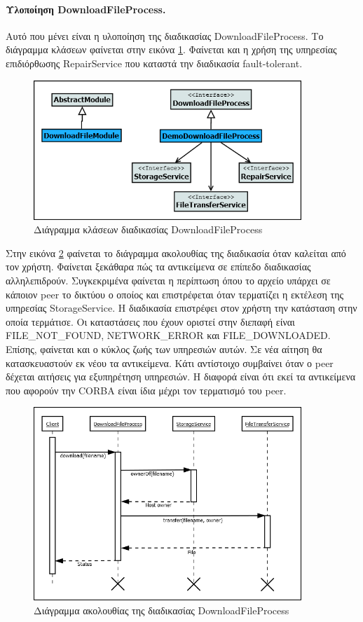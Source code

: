 \paragraph{Υλοποίηση DownloadFileProcess.}
Αυτό που μένει είναι η υλοποίηση της διαδικασίας 
DownloadFileProcess. Το διάγραμμα κλάσεων φαίνεται στην εικόνα 
\ref{fig:DownloadFileProcess}. Φαίνεται και η χρήση της υπηρεσίας 
επιδιόρθωσης RepairService που καταστά την διαδικασία fault-tolerant.

\begin{figure}[htbp]
  \begin{center}
    \includegraphics[width=0.9\textwidth]{Figures/Demo/DownloadFileProcess_ClassDiagram.png}
  \end{center}
  \caption{Διάγραμμα κλάσεων διαδικασίας DownloadFileProcess}
  \label{fig:DownloadFileProcess}
\end{figure}

Στην εικόνα \ref{fig:DownloadFile_Sequence} φαίνεται το διάγραμμα 
ακολουθίας της διαδικασία όταν καλείται από τον χρήστη. Φαίνεται ξεκάθαρα 
πώς τα αντικείμενα σε επίπεδο διαδικασίας αλληλεπιδρούν. Συγκεκριμένα φαίνεται 
η περίπτωση όπου το αρχείο υπάρχει σε κάποιον peer το δικτύου ο οποίος 
και επιστρέφεται όταν τερματίζει η εκτέλεση της υπηρεσίας 
StorageService. Η διαδικασία επιστρέφει στον χρήστη την κατάσταση στην 
οποία τερμάτισε. Οι καταστάσεις που έχουν οριστεί στην διεπαφή είναι 
FILE\_NOT\_FOUND, NETWORK\_ERROR και FILE\_DOWNLOADED. Επίσης, φαίνεται 
και ο κύκλος ζωής των υπηρεσιών αυτών. Σε νέα αίτηση θα κατασκευαστούν 
εκ νέου τα αντικείμενα. Κάτι αντίστοιχο συμβαίνει όταν ο peer δέχεται 
αιτήσεις για εξυπηρέτηση υπηρεσιών. Η διαφορά είναι ότι εκεί τα 
αντικείμενα που αφορούν την CORBA είναι ίδια μέχρι τον τερματισμό του 
peer.

\begin{figure}[htbp]
  \begin{center}
    \includegraphics[width=0.9\textwidth]{Figures/Demo/DownloadFileProcess_Sequence.png}
  \end{center}
  \caption{Διάγραμμα ακολουθίας της διαδικασίας DownloadFileProcess}
  \label{fig:DownloadFile_Sequence}
\end{figure}
